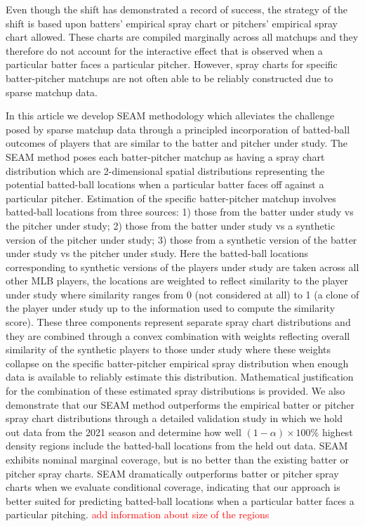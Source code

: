\documentclass[12pt]{article}
\begin{document}
Even though the shift has demonstrated a record of success, the strategy of the shift is based upon batters' empirical spray chart or pitchers' empirical spray chart allowed. These charts are compiled marginally across all matchups and they therefore do not account for the interactive effect that is observed when a particular batter faces a particular pitcher. However, spray charts for specific batter-pitcher matchups are not often able to be reliably constructed due to sparse matchup data. 

In this article we develop SEAM methodology which alleviates the challenge posed by sparse matchup data through a principled incorporation of batted-ball outcomes of players that are similar to the batter and pitcher under study. The SEAM method poses each batter-pitcher matchup as having a spray chart distribution which are 2-dimensional spatial distributions representing the potential batted-ball locations when a particular batter faces off against a particular pitcher. %
Estimation of the specific batter-pitcher matchup involves batted-ball locations from three sources: 1) those from the batter under study vs the pitcher under study; 2) those from the batter under study vs a synthetic version of the pitcher under study; 3) those from a synthetic version of the batter under study vs the pitcher under study. Here the batted-ball locations corresponding to synthetic versions of the players under study are taken across all other MLB players, the locations are weighted to reflect similarity to the player under study where similarity ranges from 0 (not considered at all) to 1 (a clone of the player under study up to the information used to compute the similarity score). These three components represent separate spray chart distributions and they are combined through a convex combination with weights reflecting overall similarity of the synthetic players to those under study where these weights collapse on the specific batter-pitcher empirical spray distribution when enough data is available to reliably estimate this distribution. Mathematical justification for the combination of these estimated spray distributions is provided. We also demonstrate that our SEAM method outperforms the empirical batter or pitcher spray chart distributions through a detailed validation study in which we hold out data from the 2021 season and determine how well $(1-\alpha)\times 100\%$ highest density regions include the batted-ball locations from the held out data. SEAM exhibits nominal marginal coverage, but is no better than the existing batter or pitcher spray charts. SEAM dramatically outperforms batter or pitcher spray charts when we evaluate conditional coverage, indicating that our approach is better suited for predicting batted-ball locations when a particular batter faces a particular pitching. \textcolor{red}{add information about size of the regions}
\end{document}
